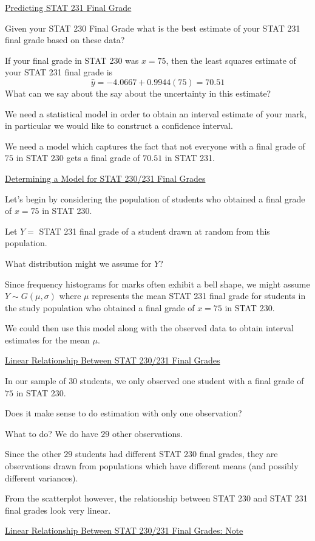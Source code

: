 \underline{Predicting STAT 231 Final Grade}

Given your STAT 230 Final Grade what is the best estimate of your STAT 231 final grade based on
these data?

If your final grade in STAT 230 was $ x=75 $, then the least squares estimate of your STAT 231
final grade is
\[\hat{y}=-4.0667+0.9944(75)=70.51\]
What can we say about the say about the uncertainty in this estimate?

We need a statistical model in order to obtain an interval estimate of your mark,
in particular we would like to construct a confidence interval.

We need a model which captures the fact that not everyone with a final grade of $ 75 $
in STAT 230 gets a final grade of $ 70.51 $ in STAT 231.

\underline{Determining a Model for STAT 230/231 Final Grades}

Let's begin by considering the population of students who obtained a final grade of $ x=75 $
in STAT 230.

Let $ Y = $ STAT 231 final grade of a student drawn at random from this population.

What distribution might we assume for $ Y $?

Since frequency histograms for marks often exhibit a bell shape, we might assume
$ Y\sim G(\mu,\sigma) $ where $ \mu $ represents the mean STAT 231 final grade for students
in the study population who obtained a final grade of $ x=75 $ in STAT 230.

We could then use this model along with the observed data to obtain interval
estimates for the mean $ \mu $.

\underline{Linear Relationship Between STAT 230/231 Final Grades}

In our sample of $ 30 $ students, we only observed one student with a final grade of $ 75 $
in STAT 230.

Does it make sense to do estimation with only one observation?

What to do? We do have $ 29 $ other observations.

Since the other $ 29 $ students had different STAT 230 final grades, they are
observations drawn from populations which have different means (and possibly different variances).

From the scatterplot however, the relationship between STAT 230 and STAT 231
final grades look very linear.


\underline{Linear Relationship Between STAT 230/231 Final Grades: Note}

